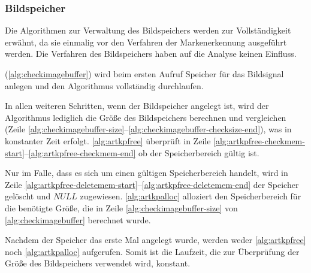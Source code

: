 \subsubsection{Bildspeicher} %
\label{sub:artoolkitplus-bildspeicher}

Die Algorithmen zur Verwaltung des Bildspeichers werden zur Vollständigkeit erwähnt, da sie einmalig vor den Verfahren
 der Markenerkennung ausgeführt werden. Die Verfahren des Bildspeichers haben auf die Analyse keinen Einfluss.

 (\autoref{alg:checkimagebuffer}) wird beim ersten Aufruf Speicher für das Bildsignal anlegen
 und den Algorithmus vollständig durchlaufen.

In allen weiteren Schritten, wenn der Bildspeicher angelegt ist, wird der Algorithmus lediglich die Größe des
 Bildspeichers berechnen und vergleichen
(Zeile \ref{alg:checkimagebuffer-size}--\ref{alg:checkimagebuffer-checksize-end}), was in konstanter Zeit erfolgt.
\autoref{alg:artkpfree} überprüft in Zeile \ref{alg:artkpfree-checkmem-start}--\ref{alg:artkpfree-checkmem-end} ob der
 Speicherbereich gültig ist.

Nur im Falle, dass es sich um einen gültigen Speicherbereich handelt, wird in Zeile
 \ref{alg:artkpfree-deletemem-start}--\ref{alg:artkpfree-deletemem-end} der Speicher gelöscht und $\mathit{NULL}$
 zugewiesen. \autoref{alg:artkpalloc} alloziert den Speicherbereich für die benötigte Größe, die in Zeile
 \ref{alg:checkimagebuffer-size} von \autoref{alg:checkimagebuffer} berechnet wurde.

Nachdem der Speicher das erste Mal angelegt wurde, werden weder \autoref{alg:artkpfree} noch \autoref{alg:artkpalloc}
 aufgerufen. Somit ist die Laufzeit, die zur Überprüfung der Größe des Bildspeichers verwendet wird, konstant.
